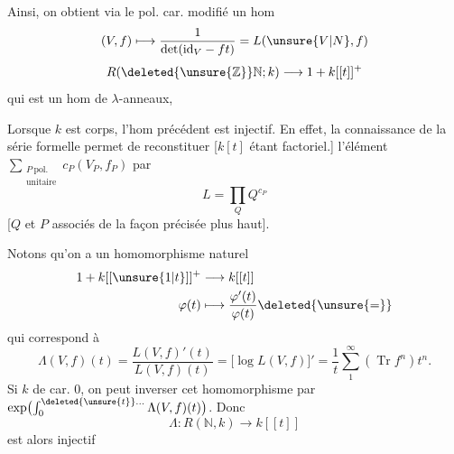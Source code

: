 Ainsi, on obtient via le pol. car. modifié un hom
\[
(V,f)\longmapsto\frac{1}{\det(\mathrm{id}_V-ft)}=L(\unsure{V|N},f)
\]
\[
R(\deleted{\unsure{\mathbb{Z}}}\mathbb{N};k)\longrightarrow 1+k[[t]]^+
\]
qui  est un hom de $\lambda$-anneaux,

Lorsque $k$ est  corps, l'hom précédent est injectif. En effet,   la connaissance de la série formelle permet de reconstituer   [$k[t]$ étant factoriel.] l'élément $\sum_{\substack{P\ \mathrm{pol.}\\\text{unitaire}}}c_P(V_P,f_P)$  par
\[
L=\prod_Q Q^{c_P}
\]
[$Q$ et $P$ associés de la façon précisée plus haut].

Notons qu'on a un homomorphisme naturel 
\[
\begin{aligned}
1+k[[\unsure{1|t}]]^+&\longrightarrow k[[t]]\\
\varphi(t)&\longmapsto\frac{\varphi'(t)}{\varphi(t)}\deleted{\unsure{=}}
\end{aligned}
\]
qui correspond à
\[
\Lambda(V,f)(t)=\frac{L(V,f)'(t)}{L(V,f)(t)}
=\bigl[\log L(V,f)\bigr]'=\frac{1}{t}\sum_{1}^{\infty}(\operatorname{Tr}f^n)t^n.
\]
 Si $k$ de car. $0$,  on peut inverser cet homomorphisme par $\exp\bigl(\int_0^{\deleted{\unsure{t}}\ldots}\Lambda(V,f)(t)\bigr)$. Donc  
\[
\Lambda:R(\mathbb{N},k)\longrightarrow k[[t]]
\]
est alors injectif 
